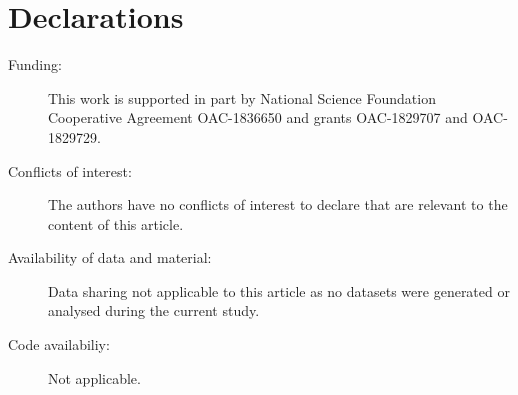 \documentclass[twocolumn]{svjour3}          %
\begin{document}
\section*{Declarations}
\begin{description}
\item[Funding:] This work is supported in part by National Science Foundation Cooperative Agreement OAC-1836650 and grants OAC-1829707 and OAC-1829729.
\item[Conflicts of interest:] The authors have no conflicts of interest to declare that are relevant to the content of this article.
\item[Availability of data and material:] Data sharing not applicable to this article as no datasets were generated or analysed during the current study.
\item[Code availabiliy:] Not applicable.
\end{description}

%
%
\end{document}

